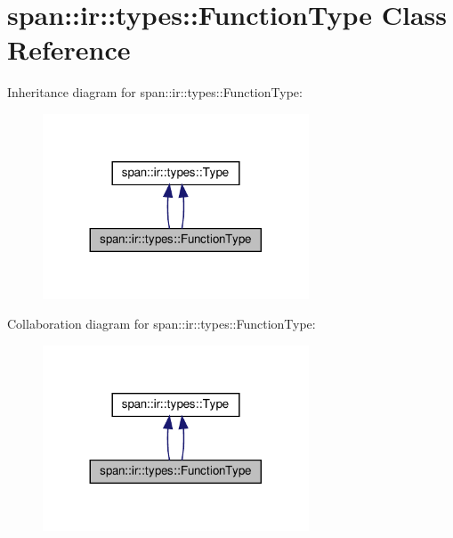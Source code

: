 \hypertarget{classspan_1_1ir_1_1types_1_1FunctionType}{}\section{span\+:\+:ir\+:\+:types\+:\+:Function\+Type Class Reference}
\label{classspan_1_1ir_1_1types_1_1FunctionType}


Inheritance diagram for span\+:\+:ir\+:\+:types\+:\+:Function\+Type\+:\nopagebreak
\begin{figure}[H]
\begin{center}
\leavevmode
\includegraphics[width=224pt]{classspan_1_1ir_1_1types_1_1FunctionType__inherit__graph}
\end{center}
\end{figure}


Collaboration diagram for span\+:\+:ir\+:\+:types\+:\+:Function\+Type\+:\nopagebreak
\begin{figure}[H]
\begin{center}
\leavevmode
\includegraphics[width=224pt]{classspan_1_1ir_1_1types_1_1FunctionType__coll__graph}
\end{center}
\end{figure}
